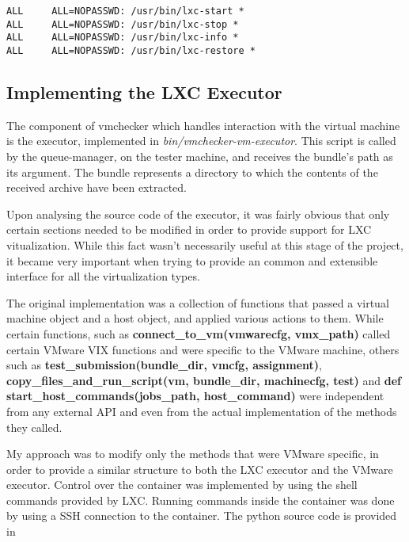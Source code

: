 \lstset{caption=Uninteractive Sudo Permission,label=lst:etc-sudoers}
\begin{lstlisting}
ALL     ALL=NOPASSWD: /usr/bin/lxc-start *
ALL     ALL=NOPASSWD: /usr/bin/lxc-stop *
ALL     ALL=NOPASSWD: /usr/bin/lxc-info *
ALL     ALL=NOPASSWD: /usr/bin/lxc-restore *
\end{lstlisting}


\subsection{Implementing the LXC Executor}
\label{sub-sec:vmc-lxc-executor}

The component of vmchecker which handles interaction with the virtual machine 
is the executor, implemented in \textit{bin/vmchecker-vm-executor}. This script
is called by the queue-manager, on the tester machine, and receives the bundle's
path as its argument. The bundle represents a directory to which the contents
of the received archive have been extracted.

Upon analysing the source code of the executor, it was fairly obvious that
only certain sections needed to be modified in order to provide support for
LXC vitualization. While this fact wasn't necessarily useful at this stage
of the project, it became very important when trying to provide an common and
extensible interface for all the virtualization types.

The original implementation was a collection of functions that passed a 
virtual machine object and a host object, and applied various actions to them.
While certain functions, such as \textbf{connect_to_vm(vmwarecfg, vmx_path)}
called certain VMware VIX functions and were specific to the VMware machine,
others such as \textbf{test_submission(bundle_dir, vmcfg, assignment)}, 
\textbf{copy_files_and_run_script(vm, bundle_dir, machinecfg, test)} and 
\textbf{def start_host_commands(jobs_path, host_command)} were independent
from any external API and even from the actual implementation of the 
methods they called.

My approach was to modify only the methods that were VMware specific, in order
to provide a similar structure to both the LXC executor and the VMware executor.
Control over the container was implemented by using the shell commands
provided by LXC. Running commands inside the container was done by using a 
SSH connection to the container. The python source code is 
provided in 

